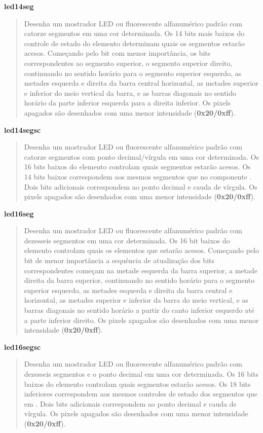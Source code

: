 \documentclass[letterpaper,10pt,brazil]{sphinxmanual}
\begin{document}
\textbf{led14seg}
\begin{quote}

Desenha um mostrador LED ou fluorescente alfanumérico padrão com
catorze segmentos em uma cor determinada. Os 14 bits mais baixos do
controle de estado do elemento determinam quais os segmentos estarão
acesos.
Começando pelo bit com menor importância, os bits correspondentes ao
segmento superior, o segmento superior direito, continuando no
sentido horário para o segmento superior esquerdo, as metades
esquerda e direita da barra central horizontal, as metades superior
e inferior do meio vertical da barra, e as barras diagonais no
sentido horário da parte inferior esquerda para a direita inferior.
Os pixels apagados são desenhados com uma menor intensidade
(\textbf{0x20/0xff}).
\end{quote}

\textbf{led14segsc}
\begin{quote}

Desenha um mostrador LED ou fluorescente alfanumérico padrão com
catorze segmentos com ponto decimal/vírgula em uma cor determinada. Os
16 bits baixos do elemento controlam quais segmentos estarão acesos.
Os 14 bits baixos correspondem aos mesmos segmentos que no
componente . Dois bits adicionais correspondem ao ponto
decimal e cauda de vírgula. Os pixels apagados são desenhados com
uma menor intensidade (\textbf{0x20/0xff}).
\end{quote}

\textbf{led16seg}
\begin{quote}

Desenha um mostrador LED ou fluorescente alfanumérico padrão com dezesseis
segmentos em uma cor determinada. Os 16 bit baixos do elemento controlam
quais os elementos que estarão acesos. Começando pelo bit de menor
importância a sequência de atualização dos bits correspondentes
começam na metade esquerda da barra superior, a metade direita da
barra superior, continuando no sentido horário para o segmento
superior esquerdo, as metades esquerda e direita da barra central e
horizontal, as metades superior e inferior da barra do meio
vertical, e as barras diagonais no sentido horário a partir do canto
inferior esquerdo até a parte inferior direito. Os pixels apagados
são desenhados com uma menor intensidade
(\textbf{0x20/0xff}).
\end{quote}

\textbf{led16segsc}
\begin{quote}

Desenha um mostrador LED ou fluorescente alfanumérico padrão com
dezesseis segmentos e o ponto decimal em uma cor determinada.
Os 16 bits baixos do elemento controlam quais segmentos estarão
acesos. Os 18 bits inferiores correspondem aos mesmos controles de
estado dos segmentos que em . Dois bits adicionais
correspondem ao ponto decimal e cauda de vírgula. Os pixels apagados
são desenhados com uma menor intensidade (\textbf{0x20/0xff}).
\end{quote}
\end{document}
